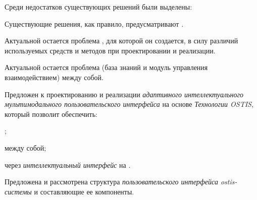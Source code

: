 Среди недостатков существующих решений были выделены:
\begin{textitemize}
	\item Существующие решения, как правило, предусматривают . 
	\item Актуальной остается проблема , для которой он создается, в силу различий используемых средств и методов при проектировании и реализации.
	\item Актуальной остается проблема  (база знаний и модуль управления взаимодействием) между собой.
\end{textitemize}

Предложен  к проектированию и реализации \textit{адаптивного интеллектуального мультимодального пользовательского интерфейса} на основе \textit{Технологии OSTIS}, который позволит обеспечить:
\begin{textitemize}
	\item {};
	\item {} между собой;
	\item {} через \textit{интеллектуальный интерфейс} на .
\end{textitemize}
Предложена и рассмотрена структура \textit{пользовательского интерфейса ostis-системы} и составляющие ее компоненты.

%